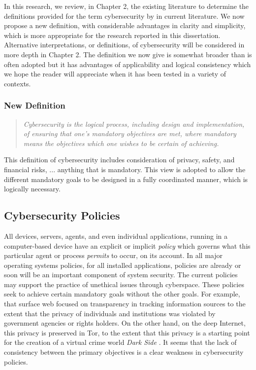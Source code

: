 In this research, we review, in Chapter 2,  the existing literature to determine the definitions provided for the term cybersecurity by in current literature. We now  propose a new definition, with considerable advantages in clarity and simplicity, 
which is more appropriate for the research reported in this dissertation. Alternative interpretations, or definitions, of cybersecurity will be considered in more depth in Chapter 2.  The definition we now give is somewhat broader than is often adopted
but it has advantages of applicability and logical consistency which
we hope the reader will appreciate when it has been tested in a 
variety of contexts.

\subsubsection*{New Definition}
\begin{quote} \em Cybersecurity is the logical process, including design and implementation, of ensuring that one's mandatory objectives are met, where mandatory means the objectives which one wishes to be certain of achieving.\end{quote}

This definition of cybersecurity includes consideration of privacy, safety, and financial risks, ...
anything that is mandatory. This view is adopted to allow the different mandatory goals
to be designed in a fully coordinated manner, which is logically necessary.

\subsection{Cybersecurity Policies}
All devices, servers, agents, and even individual applications, running in a computer-based device have an explicit or implicit {\em policy} which governs what this particular agent or process {\em permits} to occur, on its account. In all major operating systems policies, for all installed applications, policies are already or soon will be an important component of system security.
The current policies may support the practice 
of unethical issues through cyberspace.
 These policies seek to achieve certain mandatory goals without the other goals.
For example,  that surface web focused on transparency
in tracking information sources to the extent that the privacy of
individuals and institutions was violated by government agencies or
rights holders. On the other hand, on the deep Internet, this privacy
is preserved in Tor, to the extent that this
privacy is a starting point for the creation of a virtual crime world
\emph{Dark Side} \cite{gupta2021dark,kavallieros2021understanding}. It seems that the lack of consistency between the
primary objectives is a clear weakness in cybersecurity policies.


